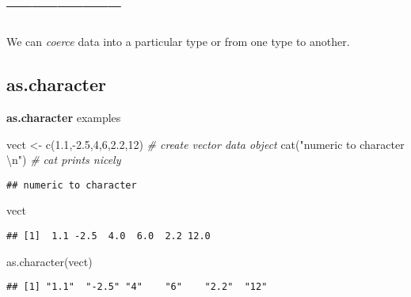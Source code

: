 \documentclass[
]{article}
\newenvironment{Shaded}{\begin{snugshade}}{\end{snugshade}}
\newcommand{\CommentTok}[1]{\textcolor[rgb]{0.56,0.35,0.01}{\textit{#1}}}
\newcommand{\DecValTok}[1]{\textcolor[rgb]{0.00,0.00,0.81}{#1}}
\newcommand{\FloatTok}[1]{\textcolor[rgb]{0.00,0.00,0.81}{#1}}
\newcommand{\FunctionTok}[1]{\textcolor[rgb]{0.00,0.00,0.00}{#1}}
\newcommand{\NormalTok}[1]{#1}
\newcommand{\OtherTok}[1]{\textcolor[rgb]{0.56,0.35,0.01}{#1}}
\newcommand{\SpecialCharTok}[1]{\textcolor[rgb]{0.00,0.00,0.00}{#1}}
\newcommand{\StringTok}[1]{\textcolor[rgb]{0.31,0.60,0.02}{#1}}
\begin{document}
\hypertarget{section-25}{%
\section{--------------}\label{section-25}}

We can \emph{coerce} data into a particular type or from one type to
another.

\hypertarget{as.character}{%
\subsection{as.character}\label{as.character}}

\textbf{as.character} examples

\begin{Shaded}
\begin{Highlighting}[]
\NormalTok{vect }\OtherTok{\textless{}{-}} \FunctionTok{c}\NormalTok{(}\FloatTok{1.1}\NormalTok{,}\SpecialCharTok{{-}}\FloatTok{2.5}\NormalTok{,}\DecValTok{4}\NormalTok{,}\DecValTok{6}\NormalTok{,}\FloatTok{2.2}\NormalTok{,}\DecValTok{12}\NormalTok{) }\CommentTok{\# create vector data object}
\FunctionTok{cat}\NormalTok{(}\StringTok{"numeric to character }\SpecialCharTok{\textbackslash{}n}\StringTok{"}\NormalTok{)  }\CommentTok{\# cat prints nicely}
\end{Highlighting}
\end{Shaded}

\begin{verbatim}
## numeric to character
\end{verbatim}

\begin{Shaded}
\begin{Highlighting}[]
\NormalTok{vect}
\end{Highlighting}
\end{Shaded}

\begin{verbatim}
## [1]  1.1 -2.5  4.0  6.0  2.2 12.0
\end{verbatim}

\begin{Shaded}
\begin{Highlighting}[]
\FunctionTok{as.character}\NormalTok{(vect)}
\end{Highlighting}
\end{Shaded}

\begin{verbatim}
## [1] "1.1"  "-2.5" "4"    "6"    "2.2"  "12"
\end{verbatim}
\end{document}
